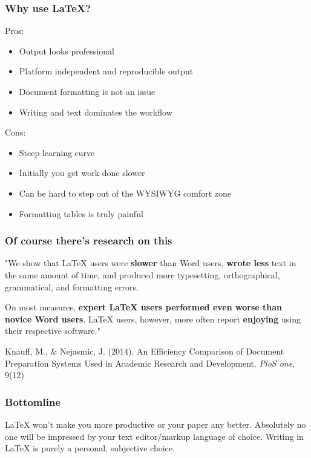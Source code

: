 \documentclass{beamer}
\begin{document}
\begin{frame}
	\frametitle{Why use LaTeX?}
	Pros:
	\begin{itemize}
		\item Output looks professional \pause
		\item Platform independent and reproducible output \pause
		\item Document formatting is not an issue \pause
		\item Writing and text dominates the workflow \pause
	\end{itemize}
	\medskip

	Cons:
	\begin{itemize}
		\item Steep learning curve \pause
		\item Initially you get work done slower \pause
		\item Can be hard to step out of the WYSIWYG comfort zone \pause
		\item Formatting tables is truly painful
	\end{itemize}
\end{frame}



\begin{frame}
	\frametitle{Of course there's research on this}
	"We show that LaTeX users were \textbf{slower} than Word users, \textbf{wrote less} text in the same amount of time, and produced more typesetting, orthographical, grammatical, and formatting errors.
	\medskip 
	
	On most measures, \textbf{expert LaTeX users performed even worse than novice Word users}. LaTeX users, however, more often report \textbf{enjoying} using their respective software." 
	\bigskip
	
	{\footnotesize Knauff, M., & Nejasmic, J. (2014). An Efficiency Comparison of Document Preparation Systems Used in Academic Research and Development. \textit{PloS one}, 9(12)\par}
\bigskip
\end{frame}





\begin{frame}
\frametitle{Bottomline}
LaTeX won't make you more productive or your paper any better. Absolutely no one will be impressed by your text editor/markup language of choice. Writing in LaTeX is purely a personal, subjective choice.\pause
\end{frame}
\end{document}
